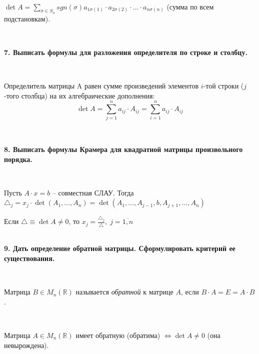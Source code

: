 \documentclass{article}
\begin{document}
    {
        $\;$
        \setlength{\parindent}{0.4cm}
        \hangindent=0.4cm

        $\det A=\sum\limits_{\sigma\in S_n} sgn(\sigma) a_{1\sigma(1)}\cdot a_{2\sigma(2)}\cdot\ldots\cdot a_{n\sigma(n)}$ (сумма по всем подстановкам).

        $\;$
        \setlength{\parindent}{0cm}
        \hangindent=0cm
    }

    \textbf{7. Выписать формулы для разложения определителя по строке и столбцу.}

    {
        $\;$
        \setlength{\parindent}{0.4cm}
        \hangindent=0.4cm

    Определитель матрицы A равен сумме произведений элементов $i$-той строки ($j$-того столбца) на их алгебраические дополнения:
        $$\det A=\sum\limits_{j=1}^n a_{ij}\cdot A_{ij}=\sum\limits_{i=1}^n a_{ij}\cdot A_{ij}$$

        $\;$
        \setlength{\parindent}{0cm}
        \hangindent=0cm
    }

    \newpage

    \textbf{8. Выписать формулы Крамера для квадратной матрицы произвольного порядка.}

    {
        $\;$
        \setlength{\parindent}{0.4cm}
        \hangindent=0.4cm

    Пусть $A\cdot x=b$ -- совместная СЛАУ. Тогда $\triangle_j = x_j\cdot\det(A_1,\ldots, A_n)=\det(A_1, \ldots, A_{j-1}, b, A_{j+1}, \ldots, A_n)$

        Если $\triangle\equiv\det A\ne 0$, то
        $x_j=\frac{\triangle_j}{\triangle}, \; j=\overline{1, n}$\\

        $\;$
        \setlength{\parindent}{0cm}
        \hangindent=0cm
    }




    \textbf{9. Дать определение обратной матрицы. Сформулировать критерий ее существования.}

    {
        $\;$
        \setlength{\parindent}{0.4cm}
        \hangindent=0.4cm

    Матрица $B\in M_n(\mathbb{R})$ называется \textit{обратной} к матрице $A$, если $B\cdot A=E=A\cdot B$.

        $\;$

        Матрица $A\in M_n(\mathbb{R})$ имеет обратную (обратима) $\Leftrightarrow\det A\ne0$ (она невырождена).

        $\;$
        \setlength{\parindent}{0cm}
        \hangindent=0cm
    }
\end{document}
